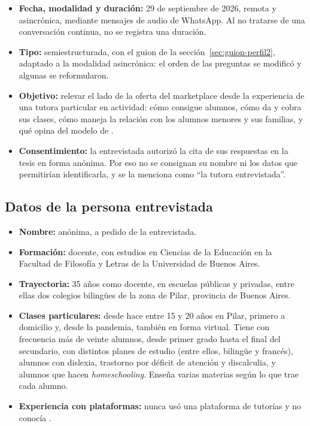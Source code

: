 \begin{itemize}
    \item \textbf{Fecha, modalidad y duración:} 29 de septiembre de 2026,
          remota y asincrónica, mediante mensajes de audio de WhatsApp.
          Al no tratarse de una conversación continua, no se registra una
          duración.
    \item \textbf{Tipo:} semiestructurada, con el guion de la
          sección~\ref{sec:guion-perfil2}, adaptado a la modalidad
          asincrónica: el orden de las preguntas se modificó y algunas se
          reformularon.
    \item \textbf{Objetivo:} relevar el lado de la oferta del
          \gls{marketplace} desde la experiencia de una tutora particular
          en actividad: cómo consigue alumnos, cómo da y cobra sus
          clases, cómo maneja la relación con los alumnos menores y sus
          familias, y qué opina del modelo de \sistema{}.
    \item \textbf{Consentimiento:} la entrevistada autorizó la cita de
          sus respuestas en la tesis en forma anónima. Por eso no se
          consignan su nombre ni los datos que permitirían identificarla,
          y se la menciona como ``la tutora entrevistada''.
\end{itemize}

\subsection{Datos de la persona entrevistada}

\begin{itemize}
    \item \textbf{Nombre:} anónima, a pedido de la entrevistada.
    \item \textbf{Formación:} docente, con estudios en Ciencias de la
          Educación en la Facultad de Filosofía y Letras de la
          Universidad de Buenos Aires.
    \item \textbf{Trayectoria:} 35 años como docente, en escuelas públicas
          y privadas, entre ellas dos colegios bilingües de la zona de
          Pilar, provincia de Buenos Aires.
    \item \textbf{Clases particulares:} desde hace entre 15 y 20 años en
          Pilar, primero a domicilio y, desde la pandemia, también en forma
          virtual. Tiene con frecuencia más de veinte alumnos, desde primer
          grado hasta el final del secundario, con distintos planes de
          estudio (entre ellos, bilingüe y francés), alumnos con
          dislexia, trastorno por déficit de atención y discalculia, y
          alumnos que hacen \emph{homeschooling}. Enseña varias materias
          según lo que trae cada alumno.
    \item \textbf{Experiencia con plataformas:} nunca usó una plataforma
          de tutorías y no conocía \sistema{}.
\end{itemize}

